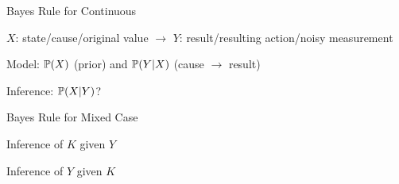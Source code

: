 \begin{frame}{Bayes Rule for Continuous}

\plitemsep 0.1in
\bci

\item<1-> $X$: state/cause/original value $\rightarrow$ $Y$: result/resulting action/noisy measurement

\item<1-> Model: $\mathbb{P}( X )$ (prior) and $\mathbb{P}( Y | X )$ (cause $\rightarrow$ result)

\item<1-> Inference: $\mathbb{P}( X | Y )$?

 \bigskip
 {
}
{

}

\eci
\end{frame}

\begin{frame}{Bayes Rule for Mixed Case}


\bigskip

\plitemsep 0.1in
{

\bci
\item<2-> Inference of $K$ given $Y$
\eci

}
{
\bci

\item<2-> Inference of $Y$ given $K$
\eci
}

\end{frame}

